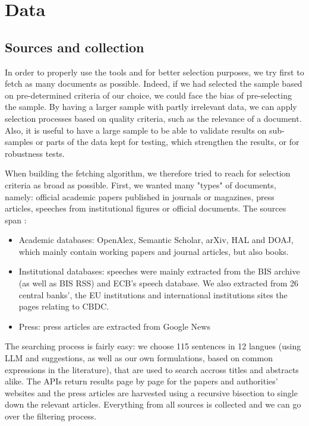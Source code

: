 \documentclass[11pt,a4paper]{article}
\begin{document}
\section{Data}\label{sec:data}
\subsection{Sources and collection}

In order to properly use the tools and for better selection purposes, we try first to fetch as many documents as
possible. Indeed, if we had selected the sample based on pre-determined criteria of our choice, we could face
the bias of pre-selecting the sample. By having a larger sample with partly irrelevant data, we can apply selection
processes based on quality criteria, such as the relevance of a document. Also, it is useful to have a large sample
to be able to validate results on sub-samples or parts of the data kept for testing, which strengthen the results, or
for robustness tests.

When building the fetching algorithm, we therefore tried to reach for selection criteria as broad as possible. First,
we wanted many "types" of documents, namely: official academic papers published in journals or magazines, press articles,
speeches from institutional figures or official documents. The sources span :

\begin{itemize}
  \item Academic databases: OpenAlex, Semantic Scholar, arXiv, HAL and DOAJ, which mainly contain working papers
  and journal articles, but also books.
  \item Institutional databases: speeches were mainly extracted from the BIS archive (as well as
  BIS RSS) and ECB's speech database. We also extracted from 26 central banks', the EU institutions and
  international institutions sites the pages relating to CBDC.
  \item Press: press articles are extracted from Google News
\end{itemize}

The searching process is fairly easy: we choose 115 sentences in 12 langues (using LLM and suggestions, as well
as our own formulations, based on common expressions in the literature), that are used to search accross titles and
abstracts alike. The APIs return results page by page for the papers and authorities' websites and
the press articles are harvested using a recursive bisection to single down the relevant articles. Everything
from all sources is collected and we can go over the filtering process.
\end{document}
